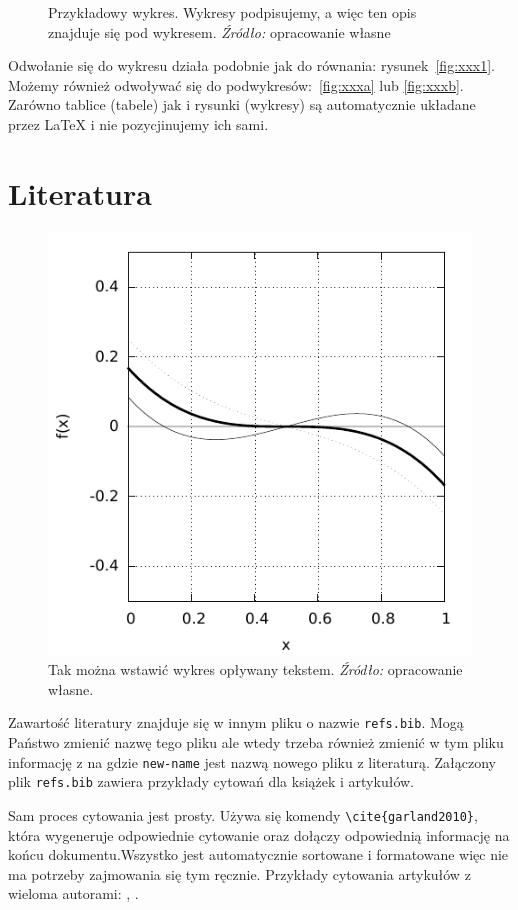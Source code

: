 \documentclass[polish, twoside, 12pt, a4paper]{article}
\theoremstyle{definition}
\theoremstyle{plain}
\theoremstyle{remark}
\begin{document}
\begin{figure}[hbt]
  \captionsetup{margin=10pt,font=small,labelfont=bf,width=.8\textwidth}

  \caption[Krótka nazwa II]{Przykładowy wykres. Wykresy podpisujemy, a więc ten opis znajduje się pod wykresem. \textit{Źródło:} opracowanie własne}\label{fig:xxx}
\end{figure}

Odwołanie się do wykresu działa podobnie jak do równania: rysunek~\ref{fig:xxx1}. Możemy również odwoływać się do podwykresów:~\ref{fig:xxxa} lub \ref{fig:xxxb}. Zarówno tablice (tabele) jak i rysunki (wykresy) są automatycznie układane przez \LaTeX{} i nie pozycjinujemy ich sami.

\clearpage
\section{Literatura}

\begin{figure}
\centering

\includegraphics[width=.4\textwidth]{figure-2}

\captionsetup{margin=10pt,font=small,labelfont=bf,width=.42\textwidth}

  \caption[Krótki podpis]{Tak można wstawić wykres opływany tekstem. \textit{Źródło:} opracowanie własne.}\label{fig:yyy}


\end{figure}


Zawartość literatury znajduje się w innym pliku o nazwie \verb+refs.bib+. Mogą Państwo zmienić nazwę tego pliku ale wtedy trzeba również zmienić w tym pliku informację z \verb++ na \verb++ gdzie \verb+new-name+ jest nazwą nowego pliku z literaturą. Załączony plik  \verb+refs.bib+ zawiera przykłady cytowań dla książek i artykułów.

Sam proces cytowania jest prosty. Używa się komendy \verb+\cite{garland2010}+, która wygeneruje odpowiednie cytowanie \cite{garland2010} oraz dołączy odpowiednią informację na końcu dokumentu.Wszystko jest automatycznie sortowane i formatowane więc nie ma potrzeby zajmowania się tym ręcznie. Przykłady cytowania artykułów z wieloma autorami: \cite{benaim2003}, \cite{osborne1998}.
\end{document}
